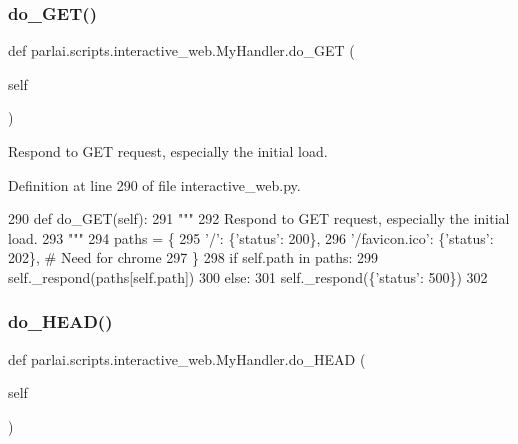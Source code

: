 \subsubsection{\texorpdfstring{do\+\_\+\+G\+E\+T()}{do\_GET()}}
{\footnotesize\ttfamily def parlai.\+scripts.\+interactive\+\_\+web.\+My\+Handler.\+do\+\_\+\+G\+ET (\begin{DoxyParamCaption}\item[{}]{self }\end{DoxyParamCaption})}

\begin{DoxyVerb}Respond to GET request, especially the initial load.
\end{DoxyVerb}
 

Definition at line 290 of file interactive\+\_\+web.\+py.


\begin{DoxyCode}
290     \textcolor{keyword}{def }do\_GET(self):
291         \textcolor{stringliteral}{"""}
292 \textcolor{stringliteral}{        Respond to GET request, especially the initial load.}
293 \textcolor{stringliteral}{        """}
294         paths = \{
295             \textcolor{stringliteral}{'/'}: \{\textcolor{stringliteral}{'status'}: 200\},
296             \textcolor{stringliteral}{'/favicon.ico'}: \{\textcolor{stringliteral}{'status'}: 202\},  \textcolor{comment}{# Need for chrome}
297         \}
298         \textcolor{keywordflow}{if} self.path \textcolor{keywordflow}{in} paths:
299             self.\_respond(paths[self.path])
300         \textcolor{keywordflow}{else}:
301             self.\_respond(\{\textcolor{stringliteral}{'status'}: 500\})
302 
\end{DoxyCode}
\mbox{\label{classparlai_1_1scripts_1_1interactive__web_1_1MyHandler_a2231328696ebba922f2e5e1d9b8ebb56}} 
\subsubsection{\texorpdfstring{do\+\_\+\+H\+E\+A\+D()}{do\_HEAD()}}
{\footnotesize\ttfamily def parlai.\+scripts.\+interactive\+\_\+web.\+My\+Handler.\+do\+\_\+\+H\+E\+AD (\begin{DoxyParamCaption}\item[{}]{self }\end{DoxyParamCaption})}

